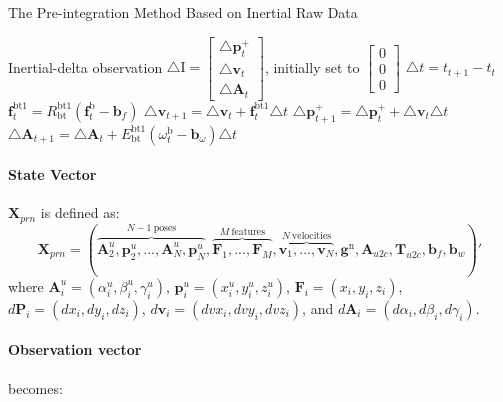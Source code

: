 \documentclass[12pt]{article}   %
\begin{document}
\begin{algorithm}
	\caption{The Pre-integration Method Based on Inertial Raw Data}
	\label{algm:preint}		
	\begin{algorithmic}
	\STATE Inertial-delta observation $ \triangle \bm{\mathrm{I}} = \begin{bmatrix} \triangle \textbf{p}_{t}^+ \\ \triangle \textbf{v}_{t} \\ \triangle \textbf{A} _{t} \end{bmatrix}$, initially set to $\begin{bmatrix} 0 \\ 0 \\ 0 \end{bmatrix}$
		\STATE $\triangle t =  t_{t+1} - t_t$ 
		\STATE $\textbf{f}_t^{\mathrm{bt1}} = R_{\mathrm{bt}}^{\mathrm{bt1}} (\textbf{f}_t^{\mathrm{b}} - \textbf{b}_f)$ 
		\STATE $\triangle \textbf{v}_{t+1} = \triangle \textbf{v}_{t} + \textbf{f}_t^{\mathrm{bt1}} \triangle t$ 
		\STATE $\triangle \textbf{p}_{t+1}^+ = \triangle \textbf{p}_{t}^+ + \triangle \textbf{v}_t \triangle t$ 
		\STATE $\triangle \textbf{A} _{t+1} = \triangle \textbf{A} _{t} + E_{\mathrm{bt}}^{\mathrm{bt1}} (\omega _t^{\mathrm{b}} - \textbf{b}_\omega) \triangle t$ 
		\ENDFOR
	\end{algorithmic}
\end{algorithm}

\paragraph{State Vector} $\textbf{X}_{prn}$ is defined as:
$$\textbf{X}_{prn} = (\overbrace{\textbf{A}^u_2, \textbf{p}^u_{2}, ... , \textbf{A}^u_{N}, \textbf{p}^u_{N}}^{N - 1 \ {\mathrm{ poses}}}, \overbrace{\textbf{F}_{1}, ..., \textbf{F}_{M}}^{M  \ {\mathrm{features}}}, \overbrace{\textbf{v}_1, ..., \textbf{v}_{N}}^{N \ {\mathrm{velocities}}},  \textbf{g}^{\mathrm{n}}, \textbf{A}_{u2c}, \textbf{T}_{u2c}, \textbf{b}_f, \textbf{b}_w)' $$
where
$\textbf{A}^u_i = (\alpha^u_i, \beta^u_i, \gamma^u_i)$,
$\textbf{p}^u_i = (x^u_i, y^u_i, z^u_i) $,
$\textbf{F}_{i} = (x_{i}, y_{i}, z_{i}) $,
$d\textbf{P}_{i} = (dx_{i}, dy_{i}, dz_{i}) $,
$d\textbf{v}_{i} = (dvx_{i}, dvy_{i}, dvz_{i}) $, and
$d\textbf{A}_{i} = (d\alpha_{i}, d\beta_{i}, d\gamma_{i}) $.

\paragraph{Observation vector} becomes:
\end{document}
